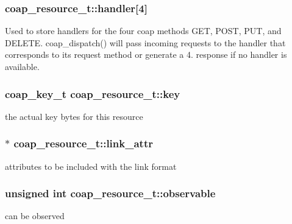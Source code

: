 \subsubsection[{handler}]{ coap\+\_\+resource\+\_\+t\+::handler\mbox{[}4\mbox{]}}\label{structcoap__resource__t_afcc8ff3f429a9e69e254665c42ac1e41}
Used to store handlers for the four coap methods {\ttfamily G\+E\+T}, {\ttfamily P\+O\+S\+T}, {\ttfamily P\+U\+T}, and {\ttfamily D\+E\+L\+E\+T\+E}. coap\+\_\+dispatch() will pass incoming requests to the handler that corresponds to its request method or generate a 4. response if no handler is available. \hypertarget{structcoap__resource__t_ad055df551d64acc0806b1df89d727d75}{}
\subsubsection[{key}]{\setlength{\rightskip}{0pt plus 5cm}coap\+\_\+key\+\_\+t coap\+\_\+resource\+\_\+t\+::key}\label{structcoap__resource__t_ad055df551d64acc0806b1df89d727d75}
the actual key bytes for this resource \hypertarget{structcoap__resource__t_a9359a93af7804828408cd7638bb2325a}{}
\subsubsection[{link\+\_\+attr}]{$\ast$ coap\+\_\+resource\+\_\+t\+::link\+\_\+attr}\label{structcoap__resource__t_a9359a93af7804828408cd7638bb2325a}
attributes to be included with the link format \hypertarget{structcoap__resource__t_ac398cbf0112b945e22176dbbf9790a87}{}
\subsubsection[{observable}]{\setlength{\rightskip}{0pt plus 5cm}unsigned int coap\+\_\+resource\+\_\+t\+::observable}\label{structcoap__resource__t_ac398cbf0112b945e22176dbbf9790a87}
can be observed \hypertarget{structcoap__resource__t_a1574825943641eaf8fd4229bcbb818c8}{}
